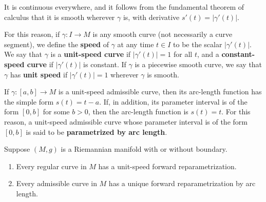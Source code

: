 It is continuous everywhere, and it follows from the fundamental theorem of calculus that it is smooth wherever $\gamma$ is, with derivative $s'(t) = |\gamma'(t)|$.

For this reason, if $\gamma: I \to M$ is any smooth curve (not necessarily a curve segment), we define the \textbf{speed} of $\gamma$ at any time $t \in I$ to be the scalar $|\gamma'(t)|$. We say that $\gamma$ is a \textbf{unit-speed curve} if $|\gamma'(t)| = 1$ for all $t$, and a \textbf{constant-speed curve} if $|\gamma'(t)|$ is constant. If $\gamma$ is a piecewise smooth curve, we say that $\gamma$ has \textbf{unit speed} if $|\gamma'(t)| = 1$ wherever $\gamma$ is smooth.

If $\gamma : [a, b] \to M$ is a unit-speed admissible curve, then its arc-length function has the simple form $s(t) = t - a$. If, in addition, its parameter interval is of the form $[0, b]$ for some $b > 0$, then the arc-length function is $s(t) = t$. For this reason, a unit-speed admissible curve whose parameter interval is of the form $[0, b]$ is said to be \textbf{parametrized by arc length}.

\begin{proposition}
\label{prop:reparametrization-by-arc-length}
Suppose $(M, g)$ is a Riemannian manifold with or without boundary.
\begin{enumerate}
\item[(a)] Every regular curve in $M$ has a unit-speed forward reparametrization.
\item[(b)] Every admissible curve in $M$ has a unique forward reparametrization by arc length.
\end{enumerate}
\end{proposition}

